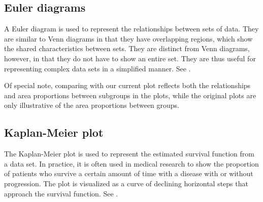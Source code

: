 \documentclass[AMA,LATO1COL]{WileyNJD-v2}
\begin{document}

\subsection{Euler diagrams}

A Euler diagram is used to represent the relationships between sets of data.
They are similar to Venn diagrams in that they have overlapping regions, which
show the shared characteristics between sets. They are distinct from Venn
diagrams, however, in that they do not have to show an entire set. They are thus
useful for representing complex data sets in a simplified manner. See
.

Of special note, comparing with  our current plot reflects
both the relationships and area proportions between subgroups in the plots,
while the original plots are only illustrative of the area proportions between
groups.

\begin{figure}
    \centering
\end{figure}

\subsection{Kaplan-Meier plot}

The Kaplan-Meier plot is used to represent the estimated survival function from
a data set. In practice, it is often used in medical research to show the
proportion of patients who survive a certain amount of time with a disease with
or without progression. The plot is visualized as a curve of declining
horizontal steps that approach the survival function. See .
\end{document}
